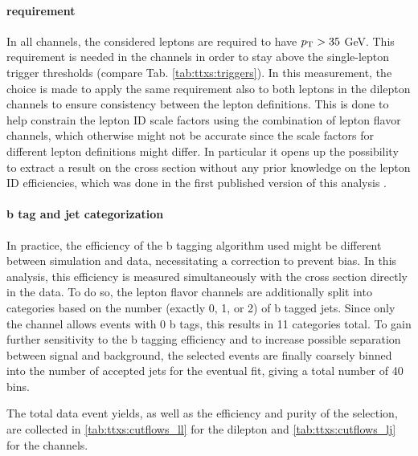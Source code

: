 \begin{table}[!t]
\end{table}

\paragraph{\pt requirement}

In all channels, the considered leptons are required to have $p_{\mathrm{T}} > 35$ GeV. This requirement is needed in the \ljets channels in order to stay above the single-lepton trigger \pt thresholds (compare Tab. \ref{tab:ttxs:triggers}). In this measurement, the choice is made to apply the same \pt requirement also to both leptons in the dilepton channels to ensure consistency between the lepton definitions. This is done to help constrain the lepton ID scale factors using the combination of lepton flavor channels, which otherwise might not be accurate since the scale factors for different lepton definitions might differ. In particular it opens up the possibility to extract a result on the cross section without any prior knowledge on the lepton ID efficiencies, which was done in the first published version of this analysis \cite{CMS:TOP-22-012-PAS}. %


\paragraph{b tag and jet categorization}

In practice, the efficiency of the b tagging algorithm used might be different between simulation and data, necessitating a correction to prevent bias. In this analysis, this efficiency is measured simultaneously with the cross section directly in the data. To do so, the lepton flavor channels are additionally split into categories based on the number (exactly 0, 1, or 2) of b tagged jets. Since only the \emu channel allows events with 0 b tags, this results in 11 categories total. To gain further sensitivity to the b tagging efficiency and to increase possible separation between \ttbar signal and background, the selected events are finally coarsely binned into the number of accepted jets for the eventual fit, giving a total number of 40 bins.

The total data event yields, as well as the efficiency and purity of the \ttbar selection, are collected in \cref{tab:ttxs:cutflows_ll} for the dilepton and \cref{tab:ttxs:cutflows_lj} for the \ljets channels.


